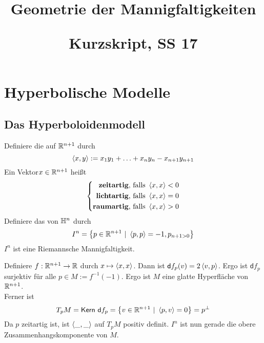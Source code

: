 \documentclass{book}
\renewcommand{\d}{\textsf{d}}
\begin{document}
\title{
\begin{huge}
Geometrie der Mannigfaltigkeiten\\
\end{huge}
\begin{large}
Kurzskript, SS 17
\end{large}}


\maketitle
\renewcommand{\i}{^{-1}}


\setcounter{tocdepth}{1}
\tableofcontents

\newpage
\chapter{Hyperbolische Modelle}
\section{Das Hyperboloidenmodell}
\Def{}
Definiere die  auf $\mathbb{R}^{n+1}$ durch
\[ \left<x,y\right> := x_1y_1 + \ldots + x_{n}y_n - x_{n+1} y_{n+1} \]
Ein Vektor$x \in \mathbb{R}^{n+1}$ heißt
\begin{align*}
\left\lbrace \begin{aligned}
\text{\df{zeitartig}, falls } &\shrp{x,x} < 0\\
\text{\df{lichtartig}, falls } &\shrp{x,x} = 0\\
\text{\df{raumartig}, falls } &\shrp{x,x} > 0
\end{aligned} \right.
\end{align*}
Definiere das  von $\mathbb{H}^n$ durch
\[ I^n = \set{p \in \R^{n+1}}{\shrp{p,p} = -1, p_{n+1 > 0}} \]
\Prop{}
$I^n$ ist eine Riemannsche Mannigfaltigkeit.
\begin{Beweis}{}
Definiere $f : \mathbb{R}^{n+1} \overset{}{\rightarrow} \mathbb{R}$ durch $x \mapsto \left<x,x\right>$. Dann ist $\d f_p(v) = 2\shrp{v,p}$. Ergo ist $\d f_p$ surjektiv für alle $p \in M :=f\i(-1)$. Ergo ist $M$ eine glatte Hyperfläche von $\mathbb{R}^{n+1}$.\\
Ferner ist
\[ T_pM = \Ker ~\d f_p  = \set{v \in \R^{n+1}}{\shrp{p,v} = 0} = p^\bot \]
Da $p$ zeitartig ist, ist $\left<\_, \_\right>$ auf $T_pM$ positiv definit. $I^n$ ist nun gerade die obere Zusammenhangskomponente von $M$.
\end{Beweis}
\end{document}
